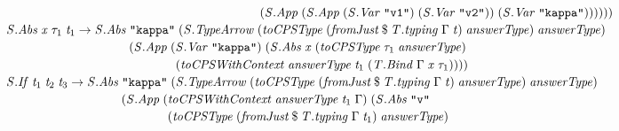 \documentclass[10pt]{article}
\newcommand{\Conid}[1]{\mathit{#1}}
\newcommand{\Varid}[1]{\mathit{#1}}
\begin{document}
\begin{hscode}
${\hskip1.00em\relax\hskip1.00em\relax\phantom{\Conid{\Conid{S}.App}\;\Varid{t}_{1}\;\Varid{t}_{2}\to \Conid{\Conid{S}.Abs}\;\mbox{}}\phantom{(\Conid{\Conid{S}.App}\;\mbox{}}\hskip4.00em\relax\hskip2.00em\relax\hskip2.00em\relax(\Conid{\Conid{S}.App}\;(\Conid{\Conid{S}.App}\;(\Conid{\Conid{S}.Var}\;\text{\tt \char34 v1\char34})\;(\Conid{\Conid{S}.Var}\;\text{\tt \char34 v2\char34}))\;(\Conid{\Conid{S}.Var}\;\text{\tt \char34 kappa\char34}))))))}$\\
${\hskip1.00em\relax\hskip1.00em\relax\Conid{\Conid{S}.Abs}\;\Varid{x}\;\tau_{1}\;\Varid{t}_{1}\to \Conid{\Conid{S}.Abs}\;\text{\tt \char34 kappa\char34}\;(\Conid{\Conid{S}.TypeArrow}\;(\Varid{toCPSType}\;(\Varid{fromJust}\mathbin{\$}\Varid{\Conid{T}.typing}\;\Gamma\;\Varid{t})\;\Varid{answerType})\;\Varid{answerType})\;}$\\
${\hskip1.00em\relax\hskip1.00em\relax\phantom{\Conid{\Conid{S}.Abs}\;\Varid{x}\;\tau_{1}\;\Varid{t}_{1}\to \Conid{\Conid{S}.Abs}\;\mbox{}}(\Conid{\Conid{S}.App}\;(\Conid{\Conid{S}.Var}\;\text{\tt \char34 kappa\char34})\;(\Conid{\Conid{S}.Abs}\;\Varid{x}\;(\Varid{toCPSType}\;\tau_{1}\;\Varid{answerType})}$\\
${\hskip1.00em\relax\hskip1.00em\relax\phantom{\Conid{\Conid{S}.Abs}\;\Varid{x}\;\tau_{1}\;\Varid{t}_{1}\to \Conid{\Conid{S}.Abs}\;\mbox{}}\phantom{(\Conid{\Conid{S}.App}\;(\mbox{}}(\Varid{toCPSWithContext}\;\Varid{answerType}\;\Varid{t}_{1}\;(\Conid{\Conid{T}.Bind}\;\Gamma\;\Varid{x}\;\tau_{1}))))}$\\
${\hskip1.00em\relax\hskip1.00em\relax\Conid{\Conid{S}.If}\;\Varid{t}_{1}\;\Varid{t}_{2}\;\Varid{t}_{3}\to \Conid{\Conid{S}.Abs}\;\text{\tt \char34 kappa\char34}\;(\Conid{\Conid{S}.TypeArrow}\;(\Varid{toCPSType}\;(\Varid{fromJust}\mathbin{\$}\Varid{\Conid{T}.typing}\;\Gamma\;\Varid{t})\;\Varid{answerType})\;\Varid{answerType})\;}$\\
${\hskip1.00em\relax\hskip1.00em\relax\phantom{\Conid{\Conid{S}.If}\;\Varid{t}_{1}\;\Varid{t}_{2}\;\Varid{t}_{3}\to \Conid{\Conid{S}.Abs}\;\mbox{}}(\Conid{\Conid{S}.App}\;(\Varid{toCPSWithContext}\;\Varid{answerType}\;\Varid{t}_{1}\;\Gamma)\;(\Conid{\Conid{S}.Abs}\;\text{\tt \char34 v\char34}}$\\
${\hskip1.00em\relax\hskip1.00em\relax\phantom{\Conid{\Conid{S}.If}\;\Varid{t}_{1}\;\Varid{t}_{2}\;\Varid{t}_{3}\to \Conid{\Conid{S}.Abs}\;\mbox{}}\phantom{(\Conid{\Conid{S}.App}\;(\mbox{}}(\Varid{toCPSType}\;(\Varid{fromJust}\mathbin{\$}\Varid{\Conid{T}.typing}\;\Gamma\;\Varid{t}_{1})\;\Varid{answerType})\;}$\\

\end{hscode}
\end{document}
